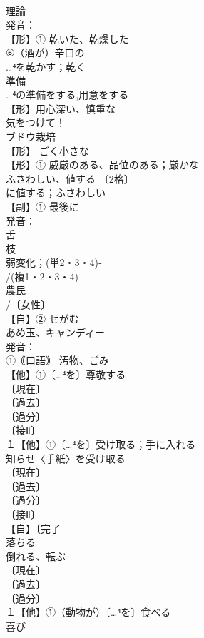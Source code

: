 \documentclass[8pt]{extreport}
\begin{document}
\begin{CJK}{UTF8}{min}
\\	理論 
\\	発音：
\\	【形】① 乾いた、乾燥した 
\\	⑥（酒が）辛口の 
\\	…⁴を乾かす；乾く
\\	準備 
\\	…⁴の準備をする,用意をする
\\	【形】用心深い、慎重な 
\\	気をつけて！
\\	ブドウ栽培
\\	【形】 ごく小さな 
\\	【形】① 威厳のある、品位のある；厳かな 
\\	ふさわしい、値する 〔2格〕
\\	に値する；ふさわしい
\\	【副】① 最後に 
\\	発音：
\\	舌 
\\	枝 
\\	弱変化；(単2・3・4)‐
\\	/(複1・2・3・4)‐
\\	農民 
\\	/〔女性〕
\\	【自】② せがむ
\\	あめ玉、キャンディー 
\\	発音：
\\	①｟口語｠ 汚物、ごみ 
\\	【他】①〔…⁴を〕尊敬する
\\	〔現在〕
\\	〔過去〕
\\	〔過分〕
\\	〔接Ⅱ〕
\\	１【他】①〔…⁴を〕受け取る；手に入れる 
\\	知らせ〈手紙〉を受け取る 
\\	〔現在〕
\\	〔過去〕
\\	〔過分〕
\\	〔接Ⅱ〕
\\	【自】〔完了
\\	落ちる 
\\	倒れる、転ぶ
\\	〔現在〕
\\	〔過去〕
\\	〔過分〕
\\	１【他】①（動物が）〔…⁴を〕食べる 
\\	喜び 

\end{CJK}
\end{document}
